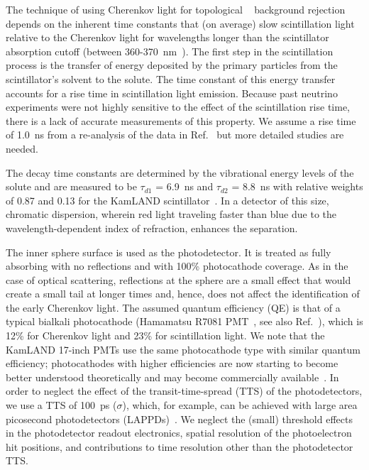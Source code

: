 The technique of using Cherenkov light for topological \B~ background rejection
depends on the inherent time constants that (on average) slow
scintillation light relative to the Cherenkov light for wavelengths
longer than the scintillator absorption cutoff (between
360-370~nm~\cite{ChristophThesis}). The first step in the scintillation
process is the transfer of energy deposited by the primary
particles from the scintillator's solvent to the solute. The time
constant of this energy transfer accounts for a rise time in
scintillation light emission. Because past neutrino experiments were
not highly sensitive to the effect of the scintillation rise time,
there is a lack of accurate measurements of this property. We assume a
rise time of 1.0~ns from a re-analysis of the data in
Ref.~\cite{ChristophThesis} but more detailed studies are needed. 

The decay time constants are determined by the vibrational energy
levels of the solute and are measured to be $\tau_{d1}$ = 6.9~ns and
$\tau_{d2}$ = 8.8~ns with relative weights of 0.87 and 0.13 for the
KamLAND scintillator~\cite{tajimaThesis}. In a detector of this size,
chromatic dispersion, wherein red light traveling faster than blue due to the
wavelength-dependent index of refraction, enhances the separation.

The inner sphere surface is used as the photodetector. It is treated
as fully absorbing with no reflections and with 100\% photocathode
coverage. As in the case of optical scattering,
reflections at the sphere are a small effect that would create a small
tail at longer times and, hence, does not affect the identification of the
early Cherenkov light. The assumed quantum efficiency (QE) is that
of a typical bialkali photocathode (Hamamatsu R7081
PMT~\cite{Hamamatsu_R7081}, see also Ref.~\cite{dctwo}), which is 12\% for 
Cherenkov light and 23\% for scintillation light.
We note that the KamLAND 17-inch PMTs use the same photocathode type with similar
quantum efficiency; photocathodes with higher efficiencies are now
starting to become better understood theoretically and may become
commercially available~\cite{Photonis, Smedley, Cultrera}.  In order to
neglect the effect of the transit-time-spread (TTS) of the
photodetectors, we use a TTS of 100~ps ($\sigma$), which, for example, can be
achieved with large area picosecond photodetectors
(LAPPDs)~\cite{Timing_paper}.
We neglect the (small) threshold effects in the photodetector readout
electronics, spatial resolution of the photoelectron hit positions,
and contributions to time resolution other than the photodetector TTS.

